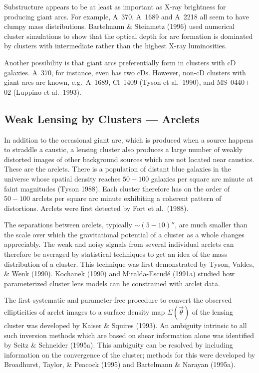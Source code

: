 \documentclass[a4paper,10pt]{article} %
\begin{document}
Substructure appears to be at least as important as X-ray brightness
for producing giant arcs. For example, A~370, A~1689 and A~2218 all
seem to have clumpy mass distributions. Bartelmann \& Steinmetz (1996)
used numerical cluster simulations to show that the optical depth for
arc formation is dominated by clusters with intermediate rather than
the highest X-ray luminosities.

Another possibility is that giant arcs preferentially form in clusters
with cD galaxies. A~370, for instance, even has two cDs. However,
non-cD clusters with giant arcs are known, e.g.\ A~1689, Cl~1409
(Tyson et al.\ 1990), and MS~0440$+$02 (Luppino et al.\ 1993).

\subsection{Weak Lensing by Clusters --- Arclets}
\label{NB:subsect4.2}

In addition to the occasional giant arc, which is produced when a
source happens to straddle a caustic, a lensing cluster also produces
a large number of weakly distorted images of other background sources
which are not located near caustics. These are the arclets. There is a
population of distant blue galaxies in the universe whose spatial
density reaches $50-100$ galaxies per square arc minute at faint
magnitudes (Tyson 1988). Each cluster therefore has on the order of
$50-100$ arclets per square arc minute exhibiting a coherent pattern
of distortions. Arclets were first detected by Fort et al.\ (1988).

The separations between arclets, typically $\sim(5-10)''$, are much
smaller than the scale over which the gravitational potential of a
cluster as a whole changes appreciably. The weak and noisy signals
from several individual arclets can therefore be averaged by
statistical techniques to get an idea of the mass distribution of a
cluster. This technique was first demonstrated by Tyson, Valdes, \&
Wenk (1990). Kochanek (1990) and Miralda-Escud\'e (1991a) studied how
parameterized cluster lens models can be constrained with arclet data.

The first systematic and parameter-free procedure to convert the
observed ellipticities of arclet images to a surface density map
$\Sigma(\vec\theta)$ of the lensing cluster was developed by Kaiser \&
Squires (1993). An ambiguity intrinsic to all such inversion methods
which are based on shear information alone was identified by Seitz \&
Schneider (1995a). This ambiguity can be resolved by including
information on the convergence of the cluster; methods for this were
developed by Broadhurst, Taylor, \& Peacock (1995) and Bartelmann \&
Narayan (1995a).
\end{document}
